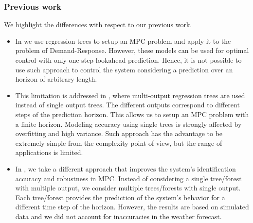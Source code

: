 \textcolor[rgb]{0,0,1}{
\subsubsection{Previous work}\label{SSS:PreviousWork}
We highlight the differences with respect to our previous work.
\begin{itemize}
	\item In \cite{Behl2016} we use regression trees to setup an MPC problem and apply it to the problem of Demand-Response.
	However, these models can be used for optimal control with only one-step lookahead prediction.
	Hence, it is not possible to use such approach to control the system considering a prediction over an horizon of arbitrary length.
	\item This limitation is addressed in \cite{Jain2017TCPS}, where multi-output regression trees are used instead of single output trees.
	The different outputs correspond to different steps of the prediction horizon.
	This allows us to setup an MPC problem with a finite horizon.
	Modeling accuracy using single trees is strongly affected by overfitting and high variance.
	Such approach has the advantage to be extremely simple from the complexity point of view, but the range of applications is limited.
	\item In \cite{JainACC2017,JainCDC2017}, we take a different approach that improves the system's identification accuracy and robustness in MPC.
	Instead of considering a single tree/forest with multiple output, we consider multiple trees/forests with single output.
	Each tree/forest provides the prediction of the system's behavior for a different time step of the horizon.
	However, the results are based on simulated data and we did not account for inaccuracies in the weather forecast.
\end{itemize}
}

